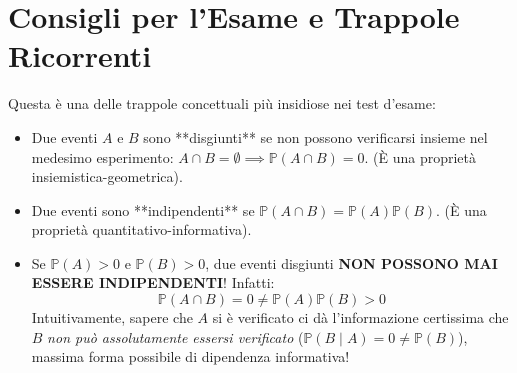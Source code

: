 \section{Consigli per l'Esame e Trappole Ricorrenti}
\label{sec:consigli_esame_cap3}

\begin{esame}
Questa è una delle trappole concettuali più insidiose nei test d'esame:
\begin{itemize}
    \item Due eventi $A$ e $B$ sono **disgiunti** se non possono verificarsi insieme nel medesimo esperimento: $A \cap B = \emptyset \implies \mathbb{P}(A \cap B) = 0$. (È una proprietà insiemistica-geometrica).
    \item Due eventi sono **indipendenti** se $\mathbb{P}(A \cap B) = \mathbb{P}(A)\mathbb{P}(B)$. (È una proprietà quantitativo-informativa).
    \item Se $\mathbb{P}(A) > 0$ e $\mathbb{P}(B) > 0$, due eventi disgiunti \textbf{NON POSSONO MAI ESSERE INDIPENDENTI}! Infatti:
    \begin{equation*}
        \mathbb{P}(A \cap B) = 0 \neq \mathbb{P}(A)\mathbb{P}(B) > 0
    \end{equation*}
    Intuitivamente, sapere che $A$ si è verificato ci dà l'informazione certissima che $B$ \emph{non può assolutamente essersi verificato} ($\mathbb{P}(B \mid A) = 0 \neq \mathbb{P}(B)$), massima forma possibile di dipendenza informativa!
\end{itemize}
\end{esame}
